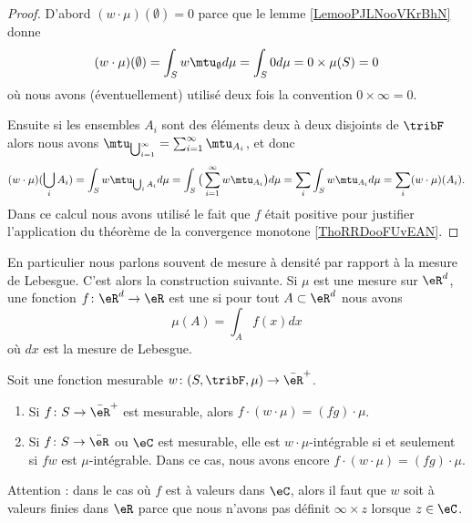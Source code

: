 \begin{proof}
    D'abord \( (w\cdot \mu)(\emptyset)=0\) parce que le lemme \ref{LemooPJLNooVKrBhN} donne
    \begin{equation}
        (w\cdot \mu)(\emptyset)=\int_Sw\mtu_{\emptyset}d\mu=\int_S0d\mu=0\times \mu(S)=0
    \end{equation}
    où nous avons (éventuellement) utilisé deux fois la convention \( 0\times \infty=0\).


    Ensuite si les ensembles \( A_i\) sont des éléments deux à deux disjoints de \( \tribF\) alors nous avons \( \mtu_{\bigcup_{i=1}^{\infty}}=\sum_{i=1}^{\infty}\mtu_{A_i}\), et donc
    \begin{equation}
        (w\cdot \mu)(\bigcup_iA_i)=\int_Sw\mtu_{\bigcup_iA_i}d\mu=\int_S\big( \sum_{i=1}^{\infty}w\mtu_{A_i} \big)d\mu=\sum_i\int_Sw\mtu_{A_i}d\mu=\sum_i(w\cdot\mu)(A_i).
    \end{equation}
    Dans ce calcul nous avons utilisé le fait que \( f\) était positive pour justifier l'application du théorème de la convergence monotone \ref{ThoRRDooFUvEAN}.
\end{proof}

En particulier nous parlons souvent de mesure à densité par rapport à la mesure de Lebesgue. C'est alors la construction suivante. Si \( \mu\) est une mesure sur \( \eR^d\), une fonction \( f\colon \eR^d\to \eR\) est une  si pour tout \( A\subset\eR^d\) nous avons
\begin{equation}
    \mu(A)=\int_Af(x)dx
\end{equation}
où \( dx\) est la mesure de Lebesgue.

\begin{proposition}  \label{PropooJMWAooDzfpmB}
    Soit une fonction mesurable \( w\colon (S,\tribF,\mu)\to \bar \eR^+\).
    \begin{enumerate}
        \item
            Si $f\colon S\to \bar\eR^+$ est mesurable, alors \( f\cdot(w\cdot \mu)=(fg)\cdot \mu\).
        \item
            Si \( f\colon S\to \bar \eR\) ou \( \eC\) est mesurable, elle est \( w\cdot\mu\)-intégrable si et seulement si \( fw\) est \( \mu\)-intégrable. Dans ce cas, nous avons encore \( f\cdot(w\cdot \mu)=(fg)\cdot\mu\).
    \end{enumerate}
    Attention : dans le cas où \( f\) est à valeurs dans \( \eC\), alors il faut que \( w\) soit à valeurs finies dans \( \eR\) parce que nous n'avons pas définit \( \infty\times z\) lorsque \( z\in \eC\).
\end{proposition}

